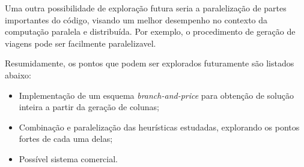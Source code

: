Uma outra possibilidade de exploração futura seria a paralelização de partes importantes do código,
visando um melhor desempenho no contexto da computação paralela e distribuída. Por exemplo, o
procedimento de geração de viagens pode ser facilmente paralelizavel.

Resumidamente, os pontos que podem ser explorados futuramente são listados abaixo:

\begin{itemize} 
\item Implementação de um esquema {\it branch-and-price} para obtenção de solução inteira a partir
da geração de colunas;
\item Combinação e paralelização das heurísticas estudadas, explorando os pontos fortes de cada uma
delas;
\item Possível sistema comercial.
\end{itemize}

